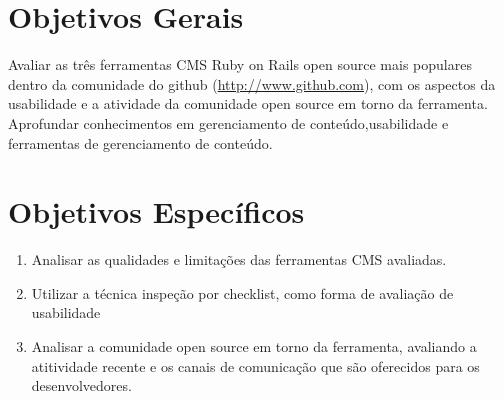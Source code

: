 \section{Objetivos Gerais}

Avaliar as três ferramentas CMS Ruby on Rails open source mais populares dentro da comunidade do github (\url{http://www.github.com}), com os aspectos da usabilidade e a atividade da comunidade open source em torno da ferramenta. Aprofundar conhecimentos em gerenciamento de conteúdo,usabilidade e ferramentas de gerenciamento de conteúdo.

\section{Objetivos Específicos}

\begin{enumerate}

\item Analisar as qualidades e limitações das ferramentas CMS avaliadas.
\item Utilizar a técnica inspeção por checklist, como forma de avaliação de usabilidade
\item Analisar a comunidade open source em torno da ferramenta, avaliando a atitividade recente e os canais de comunicação que são oferecidos para os desenvolvedores.

\end{enumerate}

